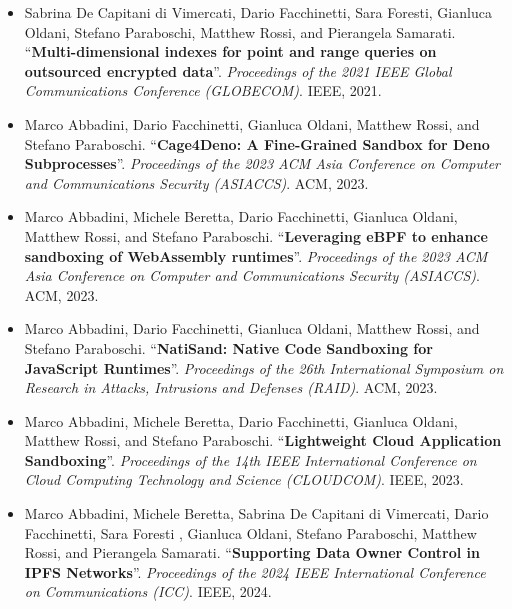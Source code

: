 \begin{itemize}
    \nocite{dffoprs-globecom2021}
    \item Sabrina De Capitani di Vimercati, Dario Facchinetti, Sara
        Foresti, Gianluca Oldani, Stefano Paraboschi, Matthew Rossi,
        and Pierangela Samarati. ``\textbf{Multi-dimensional indexes
        for point and range queries on outsourced encrypted data}''.
        {\em Proceedings of the 2021 IEEE Global Communications
        Conference (GLOBECOM)}. IEEE, 2021.

    \nocite{cage4deno}
    \item Marco Abbadini, Dario Facchinetti, Gianluca Oldani, Matthew
        Rossi, and Stefano Paraboschi. ``\textbf{Cage4Deno: A
        Fine-Grained Sandbox for Deno Subprocesses}''. {\em
        Proceedings of the 2023 ACM Asia Conference on Computer and
        Communications Security (ASIACCS)}. ACM, 2023.

    \nocite{enhance-wasm-sandbox}
    \item Marco Abbadini, Michele Beretta, Dario Facchinetti, Gianluca
        Oldani, Matthew Rossi, and Stefano Paraboschi.
        ``\textbf{Leveraging eBPF to enhance sandboxing of
        WebAssembly runtimes}''. {\em Proceedings of the 2023 ACM Asia
        Conference on Computer and Communications Security (ASIACCS)}.
        ACM, 2023.
    
    \nocite{natisand}
    \item Marco Abbadini, Dario Facchinetti, Gianluca Oldani, Matthew
        Rossi, and Stefano Paraboschi. ``\textbf{NatiSand: Native Code
        Sandboxing for JavaScript Runtimes}''. {\em Proceedings of the
        26th International Symposium on Research in Attacks,
        Intrusions and Defenses (RAID)}. ACM, 2023.

    \nocite{dmng}
    \item Marco Abbadini, Michele Beretta, Dario Facchinetti, Gianluca
        Oldani, Matthew Rossi, and Stefano Paraboschi.
        ``\textbf{Lightweight Cloud Application Sandboxing}''. {\em
        Proceedings of the 14th IEEE International Conference on Cloud
        Computing Technology and Science (CLOUDCOM)}. IEEE, 2023.

    \nocite{freya-ipfs}
    \item Marco Abbadini, Michele Beretta, Sabrina De Capitani di
        Vimercati, Dario Facchinetti, Sara Foresti , Gianluca Oldani,
        Stefano Paraboschi, Matthew Rossi, and Pierangela Samarati.
        ``\textbf{Supporting Data Owner Control in IPFS Networks}''.
        {\em Proceedings of the 2024 IEEE International Conference on
        Communications (ICC)}. IEEE, 2024.
\end{itemize}
